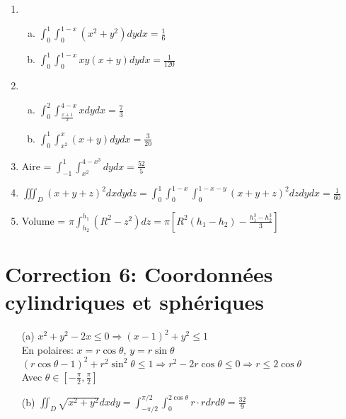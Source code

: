\begin{enumerate}
    \item 
    \begin{enumerate}[a)]
        \item $\int_0^1\int_0^{1-x}(x^2+y^2)dydx = \frac{1}{6}$
        \item $\int_0^1\int_0^{1-x}xy(x+y)dydx = \frac{1}{120}$
    \end{enumerate}
    
    \item 
    \begin{enumerate}[a)]
        \item $\int_0^2\int_{\frac{x+1}{2}}^{4-x}xdydx = \frac{7}{3}$
        \item $\int_0^1\int_{x^2}^{x}(x+y)dydx = \frac{3}{20}$
    \end{enumerate}
    
    \item Aire = $\int_{-1}^1\int_{x^2}^{4-x^3}dydx = \frac{52}{5}$
    
    \item $\iiint_D(x+y+z)^2dxdydz = \int_0^1\int_0^{1-x}\int_0^{1-x-y}(x+y+z)^2dzdydx = \frac{1}{60}$
    
    \item Volume = $\pi\int_{h_2}^{h_1}(R^2-z^2)dz = \pi\left[R^2(h_1-h_2) - \frac{h_1^3-h_2^3}{3}\right]$
\end{enumerate}

\section*{Correction 6: Coordonnées cylindriques et sphériques}

\begin{enumerate}
    \item[(a)] $x^2+y^2-2x \leq 0 \Rightarrow (x-1)^2+y^2 \leq 1$\\
    En polaires: $x = r\cos\theta$, $y = r\sin\theta$\\
    $(r\cos\theta-1)^2 + r^2\sin^2\theta \leq 1 \Rightarrow r^2 - 2r\cos\theta \leq 0 \Rightarrow r \leq 2\cos\theta$\\
    Avec $\theta \in [-\frac{\pi}{2}, \frac{\pi}{2}]$
    
    \item[(b)] $\iint_D \sqrt{x^2+y^2}dxdy = \int_{-\pi/2}^{\pi/2}\int_0^{2\cos\theta}r\cdot rdrd\theta = \frac{32}{9}$
\end{enumerate}
